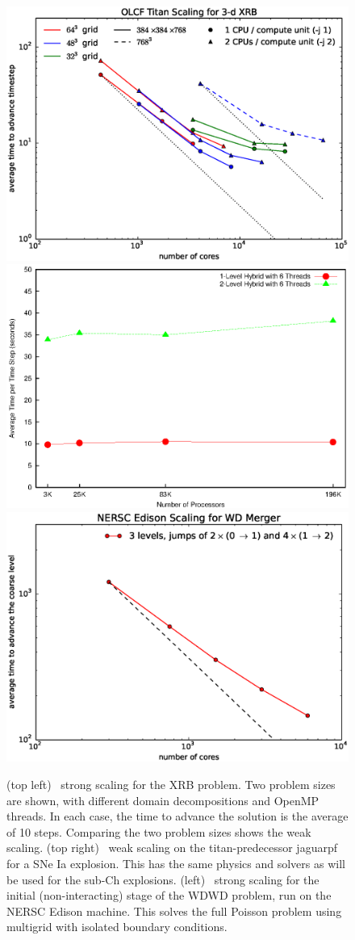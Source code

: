 \begin{figure}[t]
\centering
\includegraphics[width=0.49\linewidth]{xrb_titan_scaling_by_grid}
\includegraphics[width=0.49\linewidth]{castro_scaling} \\[0.5em]
\includegraphics[width=0.49\linewidth]{edison-wdmerger-scaling.eps}
\begin{minipage}[b]{0.5\linewidth}
\caption{\label{fig:scaling} (top left) \maestro\ strong scaling for
  the XRB problem.  Two problem sizes are shown, with 
  different domain decompositions and OpenMP
  threads.  In each case, the time to advance the solution is the
  average of 10 steps.  Comparing the two problem sizes shows the weak
  scaling.  (top right) \castro\ weak scaling on the titan-predecessor
  jaguarpf for a SNe Ia explosion.  This has the same physics and
  solvers as will be used for the sub-Ch explosions. (left)
  \castro\ strong scaling for the initial (non-interacting) stage of
  the WDWD problem, run on the NERSC Edison machine.  This solves the
  full Poisson problem using multigrid with isolated boundary
  conditions.}
\end{minipage}
\end{figure}

